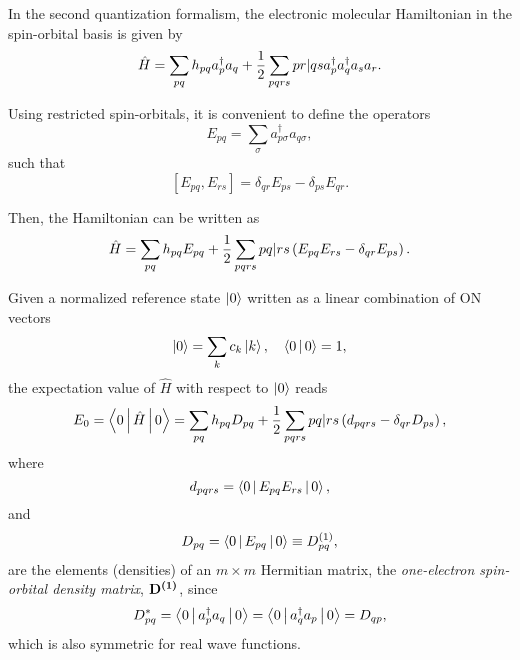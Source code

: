In the second quantization formalism, the electronic molecular Hamiltonian in 
the spin-orbital basis is given by
\begin{equation}
    \hat{H} =
    \sum_{pq} h_{pq} a_p^{\dagger} a_q
    +
    \frac{1}{2} \sum_{pqrs} \PBraket{pr | qs} a_p^{\dagger} a_q^{\dagger} a_s a_r
    .
\end{equation}

Using restricted spin-orbitals, it is convenient to define the operators 
\begin{equation}
    E_{pq} =
    \sum_{\sigma} a_{p\sigma}^{\dagger} a_{q\sigma}
    ,
\end{equation}
such that 
\begin{equation}
    \left[ E_{pq}, E_{rs} \right] =
    \delta_{qr} E_{ps} - \delta_{ps} E_{qr}
    .
\end{equation}

Then, the Hamiltonian can be written as 
\begin{equation}
    \hat{H} =
    \sum_{pq} h_{pq} E_{pq}
    + \frac{1}{2}
    \sum_{pqrs} \PBraket{pq | rs}\left( E_{pq} E_{rs} - \delta_{qr}E_{ps} \right)
    .
\end{equation}

Given a normalized reference state
$\Ket{0}$ written as a linear combination of ON vectors 
\begin{equation}
    \Ket{0} = \sum_{k} c_k \Ket{k}
    , \quad
    \Braket{0 | 0} = 1
    ,
\end{equation}
the expectation value of $\hat{H}$ with respect to $\Ket{0}$ reads
\begin{equation} \label{eq:GS-energy-1}
    E_0 = \Braket{0 | \hat{H} | 0} =
    \sum_{pq} h_{pq} D_{pq} + \frac{1}{2} \sum_{pqrs}
    \PBraket{pq | rs} \left( d_{pqrs} - \delta_{qr} D_{ps} \right)
    ,
\end{equation}
where 
\begin{equation}
    d_{pqrs} = \Braket{0 | E_{pq} E_{rs} | 0}
    ,
\end{equation}
and
\begin{equation} \label{eq:oedm-spin-representation}
    D_{pq} = \Braket{0 | E_{pq} | 0} \equiv \oedm_{pq}
    ,
\end{equation}
are the elements (densities) of an $m \times m$ Hermitian matrix, the
\textit{one-electron spin-orbital density matrix}, $ \mat{\oedm}$, since 
\begin{equation}
    D_{pq}^{*} =
    \Braket{0 | a_p^{\dagger} a_q | 0} =
    \Braket{0 | a_q^{\dagger} a_p | 0} =
    D_{qp}
    ,
\end{equation}
which is also symmetric for real wave functions.

